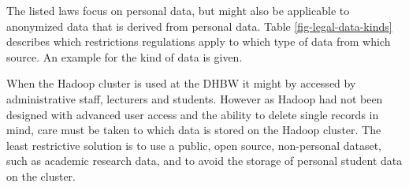 The listed laws focus on personal data, but might also be applicable to anonymized data that is derived from personal data.
Table \ref{fig-legal-data-kinds} describes which restrictions regulations apply to which type of data from which source. 
An example for the kind of data is given.

\begin{table}[hbt]
	\caption{Kinds of data and how their use might be restricted by legislation or licenses.}
	\label{fig-legal-data-kinds}
\end{table}


When the Hadoop cluster is used at the \ac{DHBW} it might by accessed by administrative staff, lecturers and students.
However as Hadoop had not been designed with advanced user access 
and the ability to delete single records in mind,  
care must be taken to which data is stored on the Hadoop cluster.
The least restrictive solution is to use a public, open source, non-personal dataset, such as academic research data, and to avoid the storage of personal student data on the cluster. 
